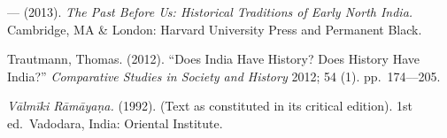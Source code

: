 \begin{thebibliography}{99}
  — (2013). \textit{The Past Before Us: Historical Traditions of Early North India.} Cambridge, MA \& London: Harvard University Press and Permanent Black.

  Trautmann, Thomas. (2012). “Does India Have History? Does History Have India?” \textit{Comparative Studies in Society and History} 2012; 54 (1). pp.~174––205.

  \textit{Vālmīki Rāmāyaṇa.} (1992). (Text as constituted in its critical edition). 1st ed.\ Vadodara, India: Oriental Institute.

 \end{thebibliography}

\theendnotes

